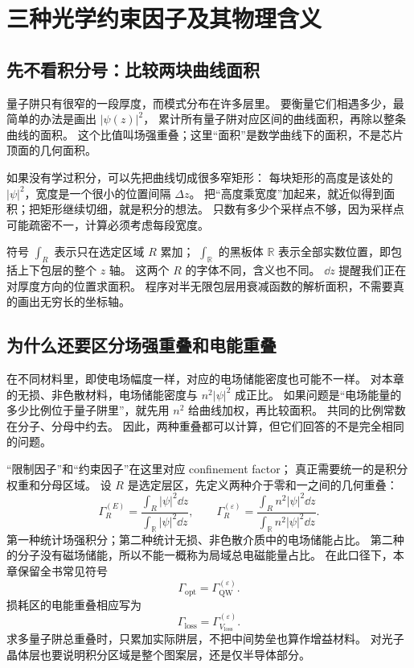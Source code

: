 \section{三种光学约束因子及其物理含义}
\label{sec:vertical-confinement}
\subsection{先不看积分号：比较两块曲线面积}
量子阱只有很窄的一段厚度，而模式分布在许多层里。
要衡量它们相遇多少，最简单的办法是画出 $|\psi(z)|^2$，
累计所有量子阱对应区间的曲线面积，再除以整条曲线的面积。
这个比值叫场强重叠；这里“面积”是数学曲线下的面积，不是芯片顶面的几何面积。

如果没有学过积分，可以先把曲线切成很多窄矩形：
每块矩形的高度是该处的 $|\psi|^2$，宽度是一个很小的位置间隔 $\Delta z$。
把“高度乘宽度”加起来，就近似得到面积；把矩形继续切细，就是积分的想法。
只数有多少个采样点不够，因为采样点可能疏密不一，计算必须考虑每段宽度。

符号 $\int_R$ 表示只在选定区域 $R$ 累加；
$\int_{\mathbb R}$ 的黑板体 $\mathbb R$ 表示全部实数位置，即包括上下包层的整个 $z$ 轴。
这两个 $R$ 的字体不同，含义也不同。
$\dd z$ 提醒我们正在对厚度方向的位置求面积。
程序对半无限包层用衰减函数的解析面积，不需要真的画出无穷长的坐标轴。

\subsection{为什么还要区分场强重叠和电能重叠}
在不同材料里，即使电场幅度一样，对应的电场储能密度也可能不一样。
对本章的无损、非色散材料，电场储能密度与 $n^2|\psi|^2$ 成正比。
如果问题是“电场能量的多少比例位于量子阱里”，就先用 $n^2$ 给曲线加权，再比较面积。
共同的比例常数在分子、分母中约去。
因此，两种重叠都可以计算，但它们回答的不是完全相同的问题。

“限制因子”和“约束因子”在这里对应 confinement factor；
真正需要统一的是积分权重和分母区域。
设 $R$ 是选定层区，先定义两种介于零和一之间的几何重叠：
\begin{equation}
\Gamma_R^{(E)}=\frac{\int_R|\psi|^2\dd z}{\int_{\mathbb R}|\psi|^2\dd z},
\qquad
\Gamma_R^{(\varepsilon)}
=\frac{\int_R n^2|\psi|^2\dd z}{\int_{\mathbb R}n^2|\psi|^2\dd z}.
\label{eq:vertical_overlap_types}
\end{equation}
第一种统计场强积分；第二种统计无损、非色散介质中的电场储能占比。
第二种的分子没有磁场储能，所以不能一概称为局域总电磁能量占比。
在此口径下，本章保留全书常见符号
\begin{equation}
\Gamma_{\mathrm{opt}}=\Gamma_{\mathrm{QW}}^{(\varepsilon)}.
\label{eq:gamma_qw}
\end{equation}
损耗区的电能重叠相应写为
\begin{equation}
\Gamma_{\mathrm{loss}}=\Gamma_{V_{\mathrm{loss}}}^{(\varepsilon)}.
\label{eq:gamma_loss}
\end{equation}
求多量子阱总重叠时，只累加实际阱层，不把中间势垒也算作增益材料。
对光子晶体层也要说明积分区域是整个图案层，还是仅半导体部分。

